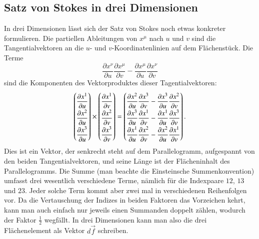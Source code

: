 \subsection{Satz von Stokes in drei Dimensionen%
\label{skript:kruemmung:section:stokes3}}
In drei Dimensionen lässt sich der Satz von Stokes noch etwas konkreter
formulieren.
Die partiellen Ableitungen von $x^\mu$ nach $u$ und $v$ sind die 
Tangentialvektoren an die $u$- und $v$-Koordinatenlinien auf dem 
Flächenstück.
Die Terme
\[
\frac{\partial x^\nu}{\partial u} \frac{\partial x^\mu}{\partial v}
-
\frac{\partial x^\mu}{\partial u} \frac{\partial x^\nu}{\partial v}
\]
sind die Komponenten des Vektorproduktes dieser Tagentialvektoren:
\[
\def\arraystretch{2.0}
\begin{pmatrix}
\displaystyle \frac{\partial x^1}{\partial u}\\
\displaystyle \frac{\partial x^2}{\partial u}\\
\displaystyle \frac{\partial x^3}{\partial u}
\end{pmatrix}
\times
\begin{pmatrix}
\displaystyle \frac{\partial x^1}{\partial v}\\
\displaystyle \frac{\partial x^2}{\partial v}\\
\displaystyle \frac{\partial x^3}{\partial v}
\end{pmatrix}
=
\begin{pmatrix}
\displaystyle
\frac{\partial x^2}{\partial u}\frac{\partial x^3}{\partial v}
-
\frac{\partial x^3}{\partial u}\frac{\partial x^2}{\partial v}
\\
\displaystyle
\frac{\partial x^3}{\partial u}\frac{\partial x^1}{\partial v}
-
\frac{\partial x^1}{\partial u}\frac{\partial x^3}{\partial v}
\\
\displaystyle
\frac{\partial x^1}{\partial u}\frac{\partial x^2}{\partial v}
-
\frac{\partial x^2}{\partial u}\frac{\partial x^1}{\partial v}
\end{pmatrix}.
\]
Dies ist ein Vektor, der senkrecht steht auf dem Parallelogramm,
aufgespannt von den beiden Tangentialvektoren, und seine Länge ist
der Flächeninhalt des Parallelogramms.
Die Summe (man beachte die Einsteinsche Summenkonvention) umfasst
drei wesentlich verschiedene Terme, nämlich für die Indexpaare
$12$, $13$ und $23$.
Jeder solche Term kommt aber zwei mal in verschiedenen Reihenfolgen
vor.
Da die Vertauschung der Indizes in beiden Faktoren das Vorzeichen 
kehrt, kann man auch einfach nur jeweils einen Summanden doppelt
zählen, wodurch der Faktor $\frac12$ wegfällt.
In drei Dimensionen kann man also die drei Flächenelement als Vektor
$d\vec f$ schreiben.

